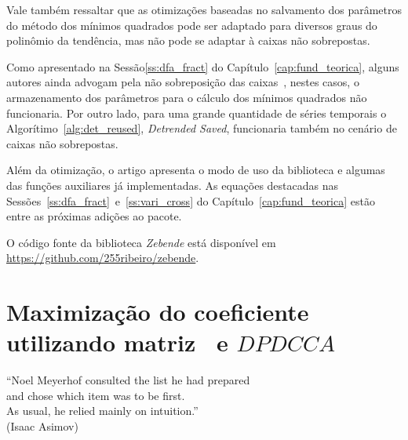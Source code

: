 Vale também ressaltar que as otimizações baseadas no salvamento dos parâmetros do método dos mínimos quadrados pode ser adaptado para diversos graus do polinômio da tendência, mas não pode se adaptar à caixas não sobrepostas.

Como apresentado na Sessão\ref{ss:dfa_fract} do Capítulo~\ref{cap:fund_teorica}, alguns autores ainda advogam pela não sobreposição das caixas~\cite{zhouMultifractalDetrendedCrosscorrelation2008}, nestes casos, o armazenamento dos parâmetros para o cálculo dos mínimos quadrados não funcionaria. Por outro lado, para uma grande quantidade de séries temporais o Algorítimo~\ref{alg:det_reused}, \emph{Detrended Saved}, funcionaria também no cenário de caixas não sobrepostas.

Além da otimização, o artigo apresenta o modo de uso da biblioteca e algumas das funções auxiliares já implementadas. As equações destacadas nas Sessões~\ref{ss:dfa_fract}~e~\ref{ss:vari_cross} do Capítulo~\ref{cap:fund_teorica} estão entre as próximas adições ao pacote.

O código fonte da biblioteca \emph{Zebende} está disponível em \url{https://github.com/255ribeiro/zebende}.


    


\section{Maximização do coeficiente \dmc utilizando matriz \pdcca~e $DPDCCA$}\label{sec:paper_03}



\begin{flushright}
    ``Noel Meyerhof consulted the list he had prepared \\
    and chose which item was to be first. \\
    As usual, he relied mainly on intuition.''\\[10px]
    (Isaac Asimov)
    \end{flushright}

